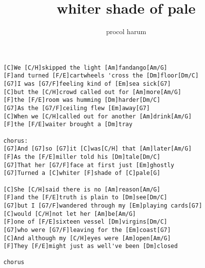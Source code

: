 \author{procol harum}
\title{whiter shade of pale}
\maketitle
\begin{verbatim}
[C]We [C/H]skipped the light [Am]fandango[Am/G]
[F]and turned [F/E]cartwheels 'cross the [Dm]floor[Dm/C]
[G7]I was [G7/F]feeling kind of [Em]sea sick[G7]
[C]but the [C/H]crowd called out for [Am]more[Am/G]
[F]the [F/E]room was humming [Dm]harder[Dm/C]
[G7]As the [G7/F]ceiling flew [Em]away[G7]
[C]When we [C/H]called out for another [Am]drink[Am/G]
[F]the [F/E]waiter brought a [Dm]tray

chorus:
[G7]And [G7]so [G7]it [C]was[C/H] that [Am]later[Am/G]
[F]As the [F/E]miller told his [Dm]tale[Dm/C]
[G7]That her [G7/F]face at first just [Em]ghostly
[G7]Turned a [C]whiter [F]shade of [C]pale[G]

[C]She [C/H]said there is no [Am]reason[Am/G]
[F]and the [F/E]truth is plain to [Dm]see[Dm/C]
[G7]but I [G7/F]wandered through my [Em]playing cards[G7]
[C]would [C/H]not let her [Am]be[Am/G]
[F]one of [F/E]sixteen vessel [Dm]virgins[Dm/C]
[G7]who were [G7/F]leaving for the [Em]coast[G7]
[C]And although my [C/H]eyes were [Am]open[Am/G]
[F]They [F/E]might just as well've been [Dm]closed

chorus
\end{verbatim}